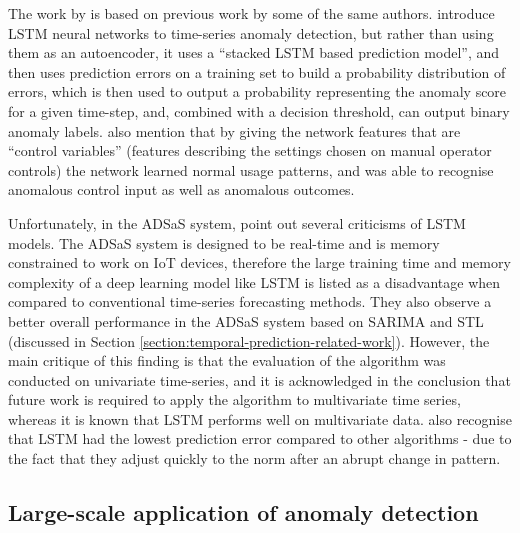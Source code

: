 \documentclass{mpaper}
\begin{document}
The work by \cite{lstmEncoderDecorder} is based on previous work by some of the same authors. \cite{lstmTimeSeriesAnomalyDetection} introduce LSTM neural networks to time-series anomaly detection, but rather than using them as an autoencoder, it uses a ``stacked LSTM based prediction model'', and then uses prediction errors on a training set to build a probability distribution of errors, which is then used to output a probability representing the anomaly score for a given time-step, and, combined with a decision threshold, can output binary anomaly labels. \cite{lstmTimeSeriesAnomalyDetection} also mention that by giving the network features that are ``control variables'' (features describing the settings chosen on manual operator controls) the network learned normal usage patterns, and was able to recognise anomalous control input as well as anomalous outcomes. 


Unfortunately, in the ADSaS system, \cite{ADSaS} point out several criticisms of LSTM models. The ADSaS system is designed to be real-time and is memory constrained to work on IoT devices, therefore the large training time and memory complexity of a deep learning model like LSTM is listed as a disadvantage when compared to conventional time-series forecasting methods. They also observe a better overall performance in the ADSaS system based on SARIMA and STL (discussed in Section \ref{section:temporal-prediction-related-work}). However, the main critique of this finding is that the evaluation of the algorithm was conducted on univariate time-series, and it is acknowledged in the conclusion that future work is required to apply the algorithm to multivariate time series, whereas it is known that LSTM performs well on multivariate data. \cite{ADSaS} also recognise that LSTM had the lowest prediction error compared to other algorithms - due to the fact that they adjust quickly to the norm after an abrupt change in pattern.

\subsection{Large-scale application of anomaly detection}
\end{document}
